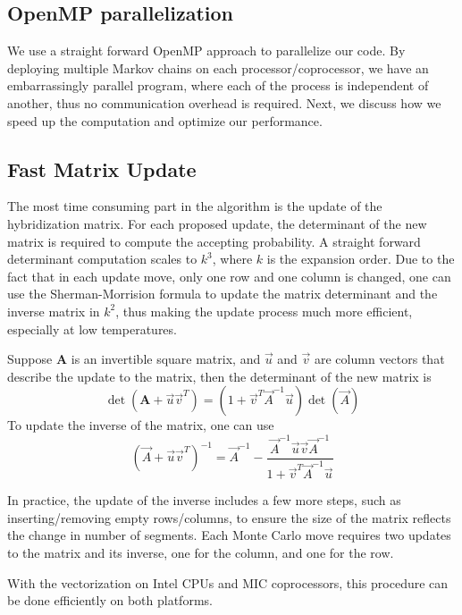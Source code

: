 \subsection{OpenMP parallelization}
We use a straight forward OpenMP approach to parallelize our code. By deploying
multiple Markov chains on each processor/coprocessor, we have an embarrassingly 
parallel program, where each of the process is independent of another, thus no
communication overhead is required. Next, we discuss how we speed up the 
computation and optimize our performance. 

\subsection{Fast Matrix Update}
\label{sec:cthyb_fmu}
The most time consuming part in the algorithm is the update of the hybridization
matrix. For each proposed update, the determinant of the new matrix is required
to compute the accepting probability. A straight forward determinant computation
scales to $k^3$, where $k$ is the expansion order. Due to the fact that in each
update move, only one row and one column is changed, one can use the 
Sherman-Morrision formula to update the matrix determinant and the inverse 
matrix in $k^2$, thus making the update process much more efficient, especially 
at low temperatures.

Suppose $\mathbf A$ is an invertible square matrix, and $\vec{u}$ and $\vec{v}$
are column vectors that describe the update to the matrix, then the determinant
of the new matrix is
\begin{equation}
\det({\mathbf A}+\vec{u}\vec{v}^T)=(1+\vec{v}^T\vec{A}^{-1}\vec{u})\det(\vec{A})
\end{equation}
To update the inverse of the matrix, one can use
\begin{equation}
(\vec{A}+\vec{u}\vec{v}^T)^{-1}=\vec{A}^{-1}-
\frac{\vec{A}^{-1}\vec{u}\vec{v}\vec{A}^{-1}}{1+\vec{v}^T\vec{A}^{-1}\vec{u}}
\end{equation}

In practice, the update of the inverse includes a few more steps, such as 
inserting/removing empty rows/columns, to ensure the size of the matrix 
reflects the change in number of segments. Each Monte Carlo move requires two
updates to the matrix and its inverse, one for the column, and one for the row.

With the vectorization on Intel CPUs and MIC coprocessors, this procedure can 
be done efficiently on both platforms.

